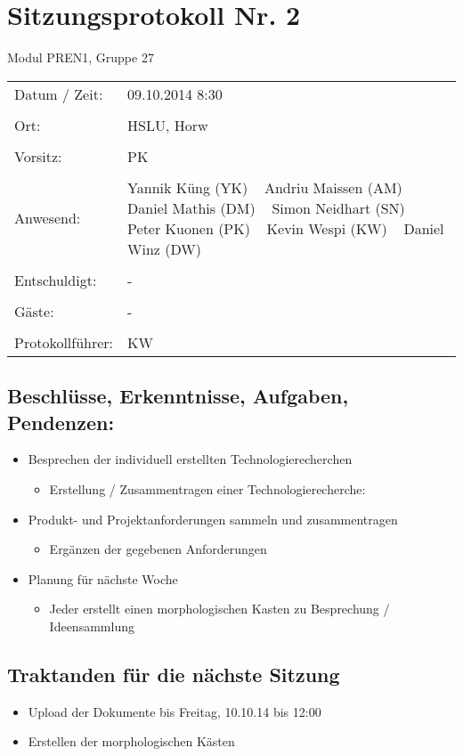 \documentclass[a4paper,10pt,fleqn]{article}
\begin{document}
\section*{Sitzungsprotokoll Nr. 2}
Modul PREN1, Gruppe 27

\begin{longtable}[l]{@{}p{}@{}p{}@{}}
    Datum / Zeit: &
        09.10.2014 8:30
        \\\\
    Ort: &
        HSLU, Horw
        \\\\
    Vorsitz: &
        PK
        \\\\
    Anwesend: &
        Yannik Küng (YK) ~
        Andriu Maissen (AM) ~
        Daniel Mathis (DM) ~
        Simon Neidhart (SN) ~
        Peter Kuonen (PK) ~
        Kevin Wespi (KW) ~
        Daniel Winz (DW) ~
        \\\\
    Entschuldigt: &
        - ~
        \\\\
    Gäste: &
        - ~
        \\\\
    Protokollführer: &
        KW
        \\
\end{longtable}
%
\subsection*{Beschlüsse, Erkenntnisse, Aufgaben, Pendenzen:}
\begin{itemize}
    \item Besprechen der individuell erstellten Technologierecherchen
	    \begin{itemize}
        \item Erstellung / Zusammentragen einer Technologierecherche:      \end{itemize}
	\item Produkt- und Projektanforderungen sammeln und zusammentragen
        \begin{itemize}
            \item Ergänzen der gegebenen Anforderungen
        \end{itemize}
    \item Planung für nächste Woche
	    \begin{itemize}
	    	\item Jeder erstellt einen morphologischen Kasten zu Besprechung / Ideensammlung
	    \end{itemize}
 \end{itemize}
%
\subsection*{Traktanden für die nächste Sitzung}
\begin{itemize}
    \item Upload der Dokumente bis Freitag, 10.10.14 bis 12:00
    \item Erstellen der morphologischen Kästen
    
\end{itemize}
%
\end{document}

